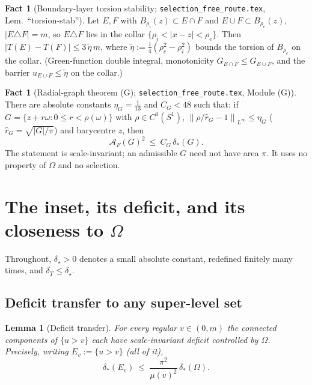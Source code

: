 \documentclass[11pt]{article}
\newtheorem{lemma}[theorem]{Lemma}
\theoremstyle{definition}
\newtheorem{fact}[theorem]{Fact}
\newcommand{\Om}{\Omega}
\newcommand{\dT}{\delta_T}
\newcommand{\AF}{\mathcal A_F}
\newcommand{\norm}[1]{\left\|#1\right\|}
\newcommand{\abs}[1]{\left|#1\right|}
\newcommand{\dstar}{\delta_{*}}
\begin{document}
\begin{fact}[Boundary-layer torsion stability;
\texttt{selection\_free\_route.tex}, Lem.~``torsion-stab'']%
\label{fact:torsion-stab}
Let $E,F$ with $B_{\rho_i}(z)\subset E\cap F$ and $E\cup F\subset
B_{\rho_e}(z)$, $\abs{E\triangle F}=m$, so $E\triangle F$ lies in the collar
$\{\rho_i<\abs{x-z}<\rho_e\}$. Then
$\abs{T(E)-T(F)}\le 3\,\tilde\eta\,m$, where
$\tilde\eta:=\tfrac14(\rho_e^2-\rho_i^2)$ bounds the torsion of $B_{\rho_e}$
on the collar. (Green-function double integral, monotonicity
$G_{E\cap F}\le G_{E\cup F}$, and the barrier $u_{E\cup F}\le\tilde\eta$ on
the collar.)
\end{fact}

\begin{fact}[Radial-graph theorem (G);
\texttt{selection\_free\_route.tex}, Module (G)]\label{fact:graph}
There are absolute constants $\eta_G=\tfrac1{13}$ and $C_G<48$ such that: if
$G=\{z+r\omega:0\le r<\rho(\omega)\}$ with $\rho\in C^0(S^1)$,
$\norm{\rho/\hat r_G-1}_{L^\infty}\le\eta_G$ \textup{(}$\hat r_G=
\sqrt{\abs G/\pi}$\textup{)} and barycentre $z$, then
\begin{equation}\label{eq:graphG}
   \AF(G)^2\ \le\ C_G\,\dstar(G).
\end{equation}
The statement is scale-invariant; an admissible $G$ need not have area $\pi$.
It uses no property of $\Om$ and no selection.
\end{fact}

\section{The inset, its deficit, and its closeness to $\Om$}
\label{sec:inset}

Throughout, $\delta_\star>0$ denotes a small absolute constant, redefined
finitely many times, and $\dT\le\delta_\star$.

\subsection{Deficit transfer to any super-level set}

\begin{lemma}[Deficit transfer]\label{lem:transfer}
For every regular $v\in(0,m)$ the connected components of $\{u>v\}$ each
have scale-invariant deficit controlled by $\Om$. Precisely, writing
$E_v:=\{u>v\}$ \textup{(}all of it\textup{)},
\begin{equation}\label{eq:transfer}
   \dstar(E_v)\ \le\ \frac{\pi^2}{\mu(v)^2}\,\dstar(\Om).
\end{equation}
\end{lemma}
\end{document}
